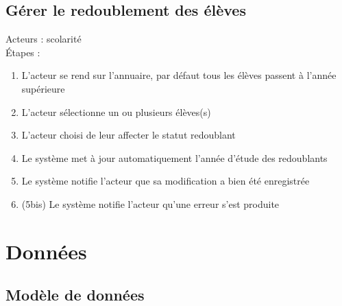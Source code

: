 \documentclass{scrreprt}
\begin{document}
\subsection{Gérer le redoublement des élèves}
Acteurs : scolarité
\\
\'Etapes :
\begin{enumerate}
\item L’acteur se rend sur l’annuaire, par défaut tous les élèves passent à l’année supérieure
\item L’acteur sélectionne un ou plusieurs élèves(s)
\item L’acteur choisi de leur affecter le statut redoublant
\item Le système met à jour automatiquement l’année d’étude des redoublants
\item Le système notifie l’acteur que sa modification a bien été enregistrée 
\item (5bis) Le système notifie l’acteur qu’une erreur s’est produite
\end{enumerate}





\section{Donn\'ees}
\subsection{Mod\`ele de donn\'ees}
\end{document}
